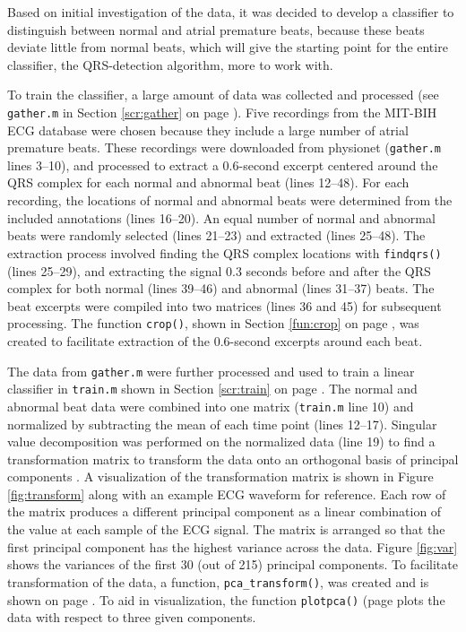 \documentclass[titlepage,12pt,letter]{article}
\newcommand{\rpref}[1]{\ref{#1} on page \pageref{#1}}
\begin{document}
Based on initial investigation of the data, it was decided to develop a
classifier to distinguish between normal and atrial premature beats, because
these beats deviate little from normal beats, which will give the starting point
for the entire classifier, the QRS-detection algorithm, more to work with.  

To train the classifier, a large amount of data was collected and processed (see
\verb`gather.m` in Section \rpref{scr:gather}).  Five recordings from the
MIT-BIH ECG database were chosen because they include a large number of atrial
premature beats.  These recordings were downloaded from physionet
(\verb`gather.m` lines 3--10), and processed to extract a 0.6-second excerpt
centered around the QRS complex for each normal and abnormal beat (lines
12--48).  For each recording, the locations of normal and abnormal beats were
determined from the included annotations (lines 16--20).  An equal number of
normal and abnormal beats were randomly selected (lines 21--23) and extracted
(lines 25--48).  The extraction process involved finding the QRS complex
locations with \verb`findqrs()` (lines 25--29), and extracting the signal 0.3
seconds before and after the QRS complex for both normal (lines 39--46) and
abnormal (lines 31--37) beats.  The beat excerpts were compiled into two
matrices (lines 36 and 45) for subsequent processing.  The function
\verb`crop()`, shown in Section \rpref{fun:crop}, was created to facilitate
extraction of the 0.6-second excerpts around each beat.  

The data from \verb`gather.m` were further processed and used to train a linear
classifier in \verb`train.m` shown in Section \rpref{scr:train}.  The normal and
abnormal beat data were combined into one matrix (\verb`train.m` line 10) and
normalized by subtracting the mean of each time point (lines 12--17).  Singular
value decomposition was performed on the normalized data (line 19) to find a
transformation matrix to transform the data onto an orthogonal basis of
principal components \cite{Shlens14}.  A visualization of the transformation
matrix is shown in Figure \ref{fig:transform} along with an example ECG waveform
for reference.  Each row of the matrix produces a different principal component
as a linear combination of the value at each sample of the ECG signal.  The
matrix is arranged so that the first principal component has the highest
variance across the data.  Figure \ref{fig:var} shows the variances of the first
30 (out of 215) principal components.  To facilitate transformation of the data,
a function, \verb`pca_transform()`, was created and is shown on page
\pageref{fun:pca}.  To aid in visualization, the function \verb`plotpca()` (page
\pageref{fun:plotpca} plots the data with respect to three given components.  
\end{document}
